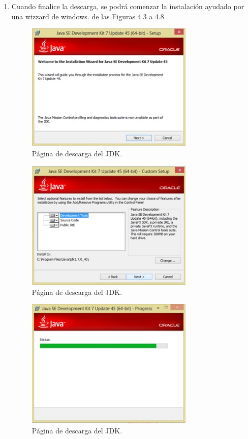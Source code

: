 \documentclass[12pt]{book} %
\begin{document}
\begin{enumerate}
\begin{figure}[!hbp]
	\end{figure}

\item Cuando finalice la descarga, se podrá comenzar la instalación ayudado por una wizzard de windows. de las Figuras 4.3 a 4.8

	\begin{figure}[!hbp]
		\centering
			\includegraphics[width=8cm]{ins3.jpg}
			\caption{Página de descarga del JDK.}
		
	\end{figure}
	\begin{figure}[!hbp]
		\centering
			\includegraphics[width=8cm]{ins4.jpg}
			\caption{Página de descarga del JDK.}
		
	\end{figure}
	\begin{figure}[!hbp]
		\centering
			\includegraphics[width=8cm]{ins5.jpg}
			\caption{Página de descarga del JDK.}
		

\end{figure}
\end{enumerate}
\end{document}
